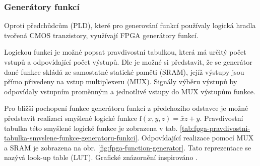 \documentclass[a4paper, twoside, 11pt]{article}
\newcommand{\fbar}{\FloatBarrier}
\begin{document}
		\fbar
		\subsubsection{Generátory funkcí}\label{subsubsec:generatory-funkci}
		Oproti předchůdcům (PLD), které pro generování funkcí používaly logická hradla tvořená CMOS tranzistory, využívají FPGA generátory funkcí.\par
		Logickou funkci je možné popsat pravdivostní tabulkou, která má určitý počet vstupů a odpovídající počet výstupů. Dle \cite{Sass2010} je možné si představit, že se generátor dané funkce skládá ze samostatné statické paměti (SRAM), jejíž výstupy jsou přímo přivedeny na vstup multiplexeru (MUX). Signály výběru výstupů by odpovídaly vstupním proměnným a jednotlivé vstupy do MUX výstupům funkce.\par
		Pro bližší pochopení funkce generátoru funkcí z předchozího odstavce je možné představit realizaci smyšlené logické funkce $\text{f} (x, y, z) = \bar{x}z + y$. Pravdivostní tabulka této smyšlené logické funkce je zobrazena v tab. \ref{tab:fpga-pravdivostni-tabulka-smyslene-funkce-generatoru-funkci}. Odpovídající realizace pomocí MUX a SRAM je zobrazena na obr. \ref{fig:fpga-function-generator}. Tato reprezentace se nazývá look-up table (LUT). Grafické znázornění inspirováno \cite{Sass2010}.
		
\end{document}
